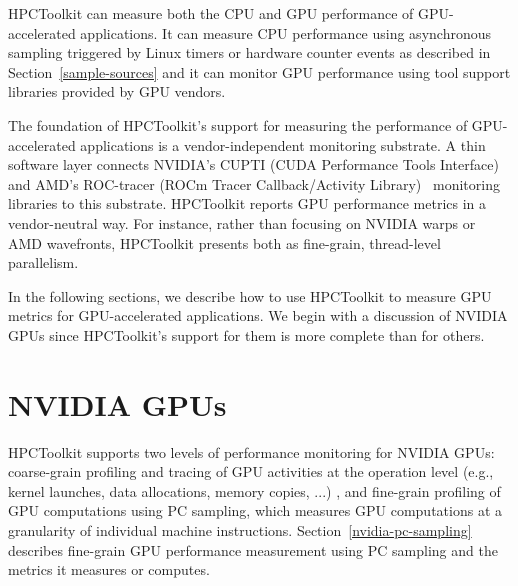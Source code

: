 HPCToolkit can measure both the CPU and GPU performance of GPU-accelerated applications. It can measure CPU performance using asynchronous sampling triggered by Linux timers or hardware counter events as described in 
Section~\ref{sample-sources} and it can monitor GPU performance using tool support libraries provided by GPU vendors.

The foundation of HPCToolkit's support for measuring the performance of GPU-accelerated applications is a vendor-independent monitoring substrate. A thin software layer connects NVIDIA's CUPTI (CUDA Performance Tools Interface)~\cite{cupti} and AMD's ROC-tracer (ROCm Tracer Callback/Activity Library)~\cite{roctracer} monitoring libraries to this substrate. HPCToolkit reports GPU performance metrics in a vendor-neutral way. For instance, rather than focusing on NVIDIA warps or AMD wavefronts, HPCToolkit presents both as fine-grain, thread-level parallelism.

In the following sections, we describe how to use HPCToolkit to measure GPU metrics for GPU-accelerated applications. We begin with a discussion of NVIDIA GPUs since HPCToolkit's support for them is more complete than for others.

\section{NVIDIA GPUs}

HPCToolkit supports two levels of performance monitoring for NVIDIA GPUs: coarse-grain profiling and tracing of GPU activities at the operation level (e.g., kernel launches, data allocations, memory copies, ...) , and fine-grain profiling of GPU computations using PC sampling, which measures GPU computations at a granularity of individual machine instructions. Section~\ref{nvidia-pc-sampling} describes fine-grain GPU performance measurement using PC sampling and the metrics it measures or computes. 

